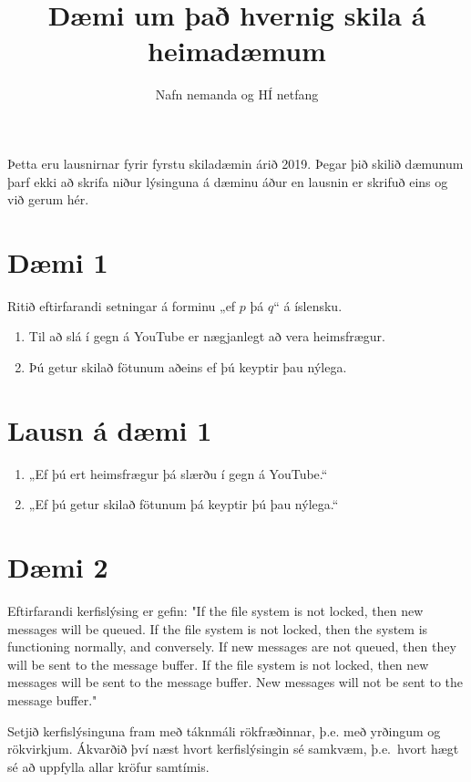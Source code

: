 \documentclass{article}
\title{Dæmi um það hvernig skila á heimadæmum}
\author{Nafn nemanda og HÍ netfang}
\begin{document}
\maketitle

Þetta eru lausnirnar fyrir fyrstu skiladæmin árið 2019. Þegar þið skilið dæmunum þarf ekki að skrifa niður lýsinguna á dæminu áður en lausnin er skrifuð eins og við gerum hér.

\section*{Dæmi 1}
Ritið eftirfarandi setningar á forminu „ef $p$ þá $q$“ á íslensku.
\begin{enumerate}
    \item Til að slá í gegn á YouTube er nægjanlegt að vera heimsfrægur.
    \item Þú getur skilað fötunum aðeins ef þú keyptir þau nýlega.
\end{enumerate}

\section*{Lausn á dæmi 1}
\begin{enumerate}
    \item „Ef þú ert heimsfrægur þá slærðu í gegn á YouTube.“
    \item „Ef þú getur skilað fötunum þá keyptir þú þau nýlega.“
\end{enumerate}

\section*{Dæmi 2}
Eftirfarandi kerfislýsing er gefin: "If the file system is not locked, then new messages will be queued. If the file system is not locked, then the system is functioning normally, and conversely. If new messages are not queued, then they will be sent to the message buffer. If the file system is not locked, then new messages will be sent to the message buffer. New messages will not be sent to the message buffer."

Setjið kerfislýsinguna fram með táknmáli rökfræðinnar, þ.e. með yrðingum og rökvirkjum. Ákvarðið því næst hvort kerfislýsingin sé samkvæm, þ.e.\ hvort hægt sé að uppfylla allar kröfur samtímis.
\end{document}
